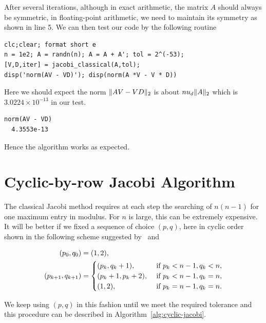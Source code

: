 After several iterations, although in exact arithmetic, the matrix $A$ should always be symmetric, in floating-point arithmetic, we need to maintain its symmetry as shown in line 5. We can then test our code by the following routine 
\begin{lstlisting}
clc;clear; format short e
n = 1e2; A = randn(n); A = A + A'; tol = 2^(-53);
[V,D,iter] = jacobi_classical(A,tol);
disp('norm(AV - VD)'); disp(norm(A *V - V * D))
\end{lstlisting}

Here we should expect the norm $\|{AV - VD}\|_2$ is about $nu_d \|{A}\|_2$ which is $3.0224\times 10^{-13}$ in our test.

\begin{lstlisting}
norm(AV - VD)
  4.3553e-13
\end{lstlisting}

Hence the algorithm works as expected.

\section{Cyclic-by-row Jacobi Algorithm}\label{sec:cyclic-jacobi}
The classical Jacobi method requires at each step the searching of $n(n-1)$ for one maximum entry in modulus. For $n$ is large, this can be extremely expensive. It will be better if we fixed a sequence of choice $(p,q)$, here in cyclic order shown in the following scheme suggested by~ and~

\begin{equation}\notag
    \begin{aligned}
        (p_0,q_0) &= (1,2), \\
        (p_{k+1},q_{k+1}) & = 
        \begin{cases}
            (p_k,q_{k}+1), & \text{ if } p_k < n-1,q_k < n,\\
            (p_k+1,p_k+2), & \text{ if } p_k < n-1, q_k = n,\\
            (1,2),& \text{ if } p_k = n-1,q_k = n.
        \end{cases}
    \end{aligned}
\end{equation}

We keep using $(p,q)$ in this fashion until we meet the required tolerance and this procedure can be described in Algorithm~\ref{alg:cyclic-jacobi}.

